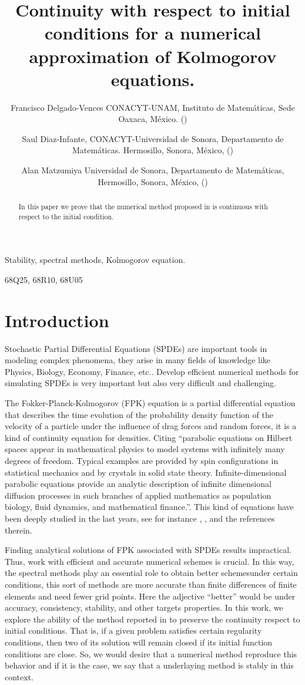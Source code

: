 \documentclass[review, onefignum, onetabnum]{siamart171218}
\title{%
    Continuity with respect to initial conditions for a numerical
    approximation of Kolmogorov equations.
}
\author{
    Francisco Delgado-Vences
    CONACYT-UNAM,
    Instituto de Matem\'aticas,
    Sede Oaxaca, M\'exico.
    (\email{delgado@im.unam.mx})
%
    \and
    Saul Diaz-Infante,
    CONACYT-Universidad
    de Sonora, Departamento de Matem\'aticas.
    Hermosillo, Sonora, M\'exico,
    (\email{saul.diazinfante@unison.mx})
%
    \and
    Alan Matzumiya
    Universidad de Sonora,
    Departamento de Matem\'aticas,
    Hermosillo, Sonora, M\'exico,
    (\email{alan.matzumiya@gmail.com})
}
\begin{document}
\maketitle

\begin{abstract}
    In this paper we prove that the numerical method proposed in \cite{de-fl}
    is continuous with respect to the initial condition.
\end{abstract}

\begin{keywords}
    Stability, spectral methods, Kolmogorov equation.
\end{keywords}

\begin{AMS}
  68Q25, 68R10, 68U05
\end{AMS}

\section{Introduction}
    Stochastic Partial Differential Equations (SPDEs) are important tools in
modeling complex phenomena, they arise in many fields of knowledge like
Physics, Biology, Economy, Finance, etc.. Develop efficient numerical
methods for simulating SPDEs is very important but also very difficult and
challenging.

    The  Fokker-Planck-Kolmogorov (FPK) equation is a partial differential
equation that describes the time evolution of the probability density function
of the velocity of a particle under the influence of drag forces and random
forces, it is a kind of continuity equation for densities. Citing \cite{da-za}
``parabolic equations on Hilbert spaces appear in mathematical physics to model
systems with infinitely many degrees of freedom. Typical examples are provided
by spin configurations in statistical mechanics and by crystals in solid state
theory. Infinite-dimensional parabolic equations provide an analytic description
of infinite dimensional diffusion processes in such branches of applied
mathematics as population biology, fluid dynamics, and mathematical finance.''.
This kind of equations have been deeply studied in the last years, see for
instance \cite{bo-da-ro}, \cite{da-fl-ro}, \cite{da} and the references therein.

    Finding analytical solutions of FPK associated with SPDEs results
impractical. Thus, work with efficient and accurate numerical schemes is
crucial. In this way, the spectral methods play an essential role to obtain
better schemes\textemdash under certain conditions, this sort of methods are
more accurate than finite differences of finite elements and  need fewer grid
points. Here the adjective ``better'' would be under accuracy, consistency,
stability, and other targets properties. In this work, we explore the ability of
the method reported in \cite{de-fl} to preserve the continuity respect to
initial conditions. That is, if a given problem satisfies certain regularity
conditions, then two of its solution will remain closed if its initial function
conditions are close. So, we would desire that a numerical method reproduce this
behavior and if it is the case, we say that a underlaying method is stably in
this context.
\end{document}
